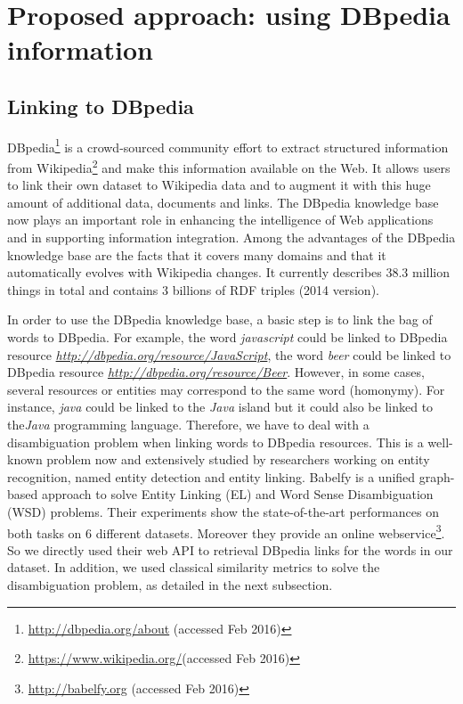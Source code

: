 \section{Proposed approach: using DBpedia information}
\label{sec:chp6secSolution}

\subsection{Linking to DBpedia}

DBpedia\footnote{\url{http://dbpedia.org/about} (accessed Feb 2016)} is a crowd-sourced community effort to extract structured information from Wikipedia\footnote{\url{https://www.wikipedia.org/}(accessed Feb 2016)} and make this information available on the Web. It allows users to link their own dataset to Wikipedia data and to augment it with this huge amount of additional data, documents and links. The DBpedia knowledge base now plays an important role in enhancing the intelligence of Web applications and in supporting information integration. Among the advantages of the DBpedia knowledge base are the facts that it covers many domains and that it automatically evolves with Wikipedia changes. It currently describes 38.3 million things in total and contains 3 billions of RDF triples (2014 version).


In order to use the DBpedia knowledge base, a basic step is to link the bag of words to DBpedia. For example, the word \textit{javascript} could be linked to DBpedia resource \textit{\url{http://dbpedia.org/resource/JavaScript}}, the word \textit{beer} could be linked to DBpedia resource	\textit{\url{http://dbpedia.org/resource/Beer}}. However, in some cases, several resources or entities may correspond to the same word (homonymy). For instance, \textit{java} could be linked to the \textit{Java} island but it could also be linked to the\textit{Java} programming language. Therefore, we have to deal with a disambiguation problem when linking words to DBpedia resources. This is a well-known problem now and extensively studied by researchers working on entity recognition, named entity detection and entity linking.  
Babelfy \cite{chp6babelfy:Moroetal:14tacl} is a unified graph-based approach to solve Entity Linking (EL) and Word Sense Disambiguation (WSD) problems. Their experiments show the state-of-the-art performances on both tasks on 6 different datasets. Moreover they provide an online webservice\footnote{\url{http://babelfy.org} (accessed Feb 2016)}. So we directly used their web API to retrieval DBpedia links for the words in our dataset. In addition, we used classical similarity metrics to solve the disambiguation problem, as detailed in the next subsection.

